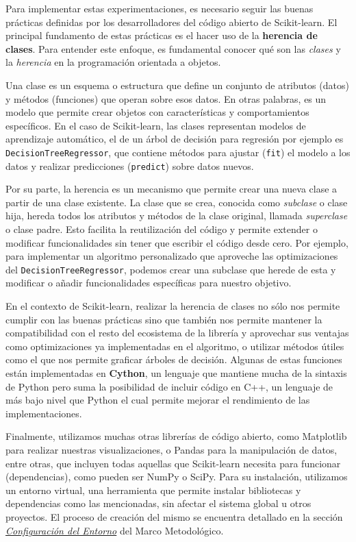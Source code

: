 Para implementar estas experimentaciones, es necesario seguir las buenas prácticas definidas por los desarrolladores del código abierto de Scikit-learn. El principal fundamento de estas prácticas es el hacer uso de la \textbf{herencia de clases}. Para entender este enfoque, es fundamental conocer qué son las \textit{clases} y la \textit{herencia} en la programación orientada a objetos.

Una clase es un esquema o estructura que define un conjunto de atributos (datos) y métodos (funciones) que operan sobre esos datos. En otras palabras, es un modelo que permite crear objetos con características y comportamientos específicos. En el caso de Scikit-learn, las clases representan modelos de aprendizaje automático, el de un árbol de decisión para regresión por ejemplo es \texttt{DecisionTreeRegressor}, que contiene métodos para ajustar (\texttt{fit}) el modelo a los datos y realizar predicciones (\texttt{predict}) sobre datos nuevos.

Por su parte, la herencia es un mecanismo que permite crear una nueva clase a partir de una clase existente. La clase que se crea, conocida como \textit{subclase} o clase hija, hereda todos los atributos y métodos de la clase original, llamada \textit{superclase} o clase padre. Esto facilita la reutilización del código y permite extender o modificar funcionalidades sin tener que escribir el código desde cero. Por ejemplo, para implementar un algoritmo personalizado que aproveche las optimizaciones del \texttt{DecisionTreeRegressor}, podemos crear una subclase que herede de esta y modificar o añadir funcionalidades específicas para nuestro objetivo.

En el contexto de Scikit-learn, realizar la herencia de clases no sólo nos permite cumplir con las buenas prácticas sino que también nos permite mantener la compatibilidad con el resto del ecosistema de la librería y aprovechar sus ventajas como optimizaciones ya implementadas en el algoritmo, o utilizar métodos útiles como el que nos permite graficar árboles de decisión. Algunas de estas funciones están implementadas en \textbf{Cython}, un lenguaje que mantiene mucha de la sintaxis de Python pero suma la posibilidad de incluir código en C++, un lenguaje de más bajo nivel que Python el cual permite mejorar el rendimiento de las implementaciones.

Finalmente, utilizamos muchas otras librerías de código abierto, como Matplotlib para realizar nuestras visualizaciones, o Pandas para la manipulación de datos, entre otras, que incluyen todas aquellas que Scikit-learn necesita para funcionar (dependencias), como pueden ser NumPy o SciPy. Para su instalación, utilizamos un entorno virtual, una herramienta que permite instalar bibliotecas y dependencias como las mencionadas, sin afectar el sistema global u otros proyectos. El proceso de creación del mismo se encuentra detallado en la sección \hyperref[confi-entorno]{\textit{Configuración del Entorno}} del Marco Metodológico.

